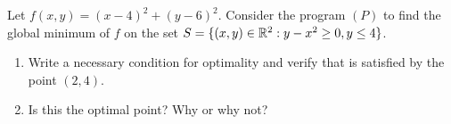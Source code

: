 \begin{problem}[Basic]\cite[lec6\_constr\_opt, 10]{Freund2004nonlinear}
Let $f(x,y)=(x-4)^2+(y-6)^2$.  Consider the program $(P)$ to find the global minimum of $f$ on the set $S = \{ (x,y) \in \mathbb{R}^2 : y-x^2\geq 0, y\leq 4 \}$.
\begin{enumerate}
	\item Write a necessary condition for optimality and verify that is satisfied by the point  $(2,4)$.
	\item Is this the optimal point? Why or why not?
\end{enumerate}
\end{problem}


